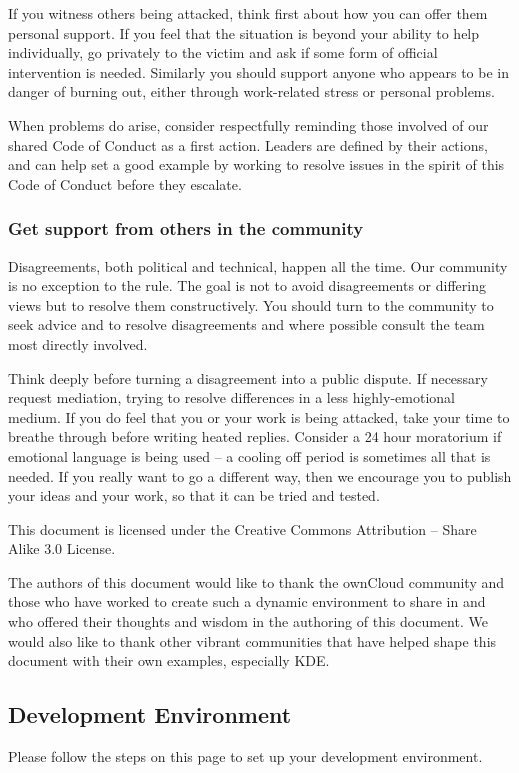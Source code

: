 \documentclass[letterpaper,10pt,english]{sphinxmanual}
\begin{document}
If you witness others being attacked, think first about how you can offer them personal support. If you feel that the situation is beyond your ability to help individually, go privately to the victim and ask if some form of official intervention is needed. Similarly you should support anyone who appears to be in danger of burning out, either through work-related stress or personal problems.

When problems do arise, consider respectfully reminding those involved of our shared Code of Conduct as a first action. Leaders are defined by their actions, and can help set a good example by working to resolve issues in the spirit of this Code of Conduct before they escalate.


\subsubsection{Get support from others in the community}
\label{general/code-of-conduct:get-support-from-others-in-the-community}
Disagreements, both political and technical, happen all the time. Our community is no exception to the rule. The goal is not to avoid disagreements or differing views but to resolve them constructively. You should turn to the community to seek advice and to resolve disagreements and where possible consult the team most directly involved.

Think deeply before turning a disagreement into a public dispute. If necessary request mediation, trying to resolve differences in a less highly-emotional medium. If you do feel that you or your work is being attacked, take your time to breathe through before writing heated replies. Consider a 24 hour moratorium if emotional language is being used – a cooling off period is sometimes all that is needed. If you really want to go a different way, then we encourage you to publish your ideas and your work, so that it can be tried and tested.

This document is licensed under the Creative Commons Attribution – Share Alike 3.0 License.

The authors of this document would like to thank the ownCloud community and those who have worked to create such a dynamic environment to share in and who offered their thoughts and wisdom in the authoring of this document. We would also like to thank other vibrant communities that have helped shape this document with their own examples, especially KDE.


\subsection{Development Environment}
\label{general/devenv:devenv}\label{general/devenv:development-environment}\label{general/devenv::doc}
Please follow the steps on this page to set up your development environment.
\end{document}
